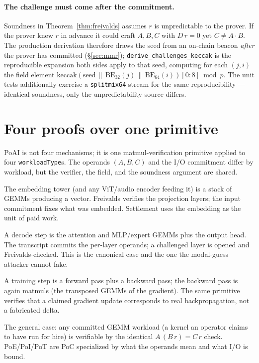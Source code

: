 \documentclass[11pt]{article}
\newcommand{\keccak}{\ensuremath{\mathrm{keccak}}}
\newcommand{\code}[1]{\texttt{#1}}
\begin{document}
\paragraph{The challenge must come after the commitment.}
Soundness in Theorem~\ref{thm:freivalds} assumes $r$ is unpredictable to the
prover. If the prover knew $r$ in advance it could craft $A,B,C$ with
$D\,r = 0$ yet $C\neq A\cdot B$. The production derivation therefore draws the
seed from an on-chain beacon \emph{after} the prover has committed
(\S\ref{sec:mmr}); \code{derive\_challenges\_keccak} is the reproducible expansion
both sides apply to that seed, computing for each $(j,i)$ the field element
$\keccak(\text{seed}\,\|\,\mathrm{BE}_{32}(j)\,\|\,\mathrm{BE}_{64}(i))[0{:}8]
\bmod p$. The unit tests additionally exercise a \code{splitmix64} stream for the
same reproducibility --- identical soundness, only the unpredictability source
differs.

\section{Four proofs over one primitive}
\label{sec:four}

PoAI is not four mechanisms; it is one matmul-verification primitive applied to
four \code{workloadType}s. The operands $(A, B, C)$ and the I/O commitment differ
by workload, but the verifier, the field, and the soundness argument are shared.

\begin{description}[leftmargin=0pt,style=nextline]
  \item[Proof of Embedding (PoE).] The embedding tower (and any ViT/audio
        encoder feeding it) is a stack of GEMMs producing a vector. Freivalds
        verifies the projection layers; the input commitment fixes what was
        embedded. Settlement uses the embedding as the unit of paid work.
  \item[Proof of Inference (PoI).] A decode step is the attention and MLP/expert
        GEMMs plus the output head. The transcript commits the per-layer
        operands; a challenged layer is opened and Freivalds-checked. This is the
        canonical case and the one the modal-guess attacker cannot fake.
  \item[Proof of Training (PoT).] A training step is a forward pass plus a
        backward pass; the backward pass is again matmuls (the transposed
        GEMMs of the gradient). The same primitive verifies that a claimed
        gradient update corresponds to real backpropagation, not a fabricated
        delta.
  \item[Proof of Compute (PoC).] The general case: any committed GEMM workload
        (a kernel an operator claims to have run for hire) is verifiable by the
        identical $A\,(B\,r) = C\,r$ check. PoE/PoI/PoT are PoC specialized by
        what the operands mean and what I/O is bound.
\end{description}
\end{document}
